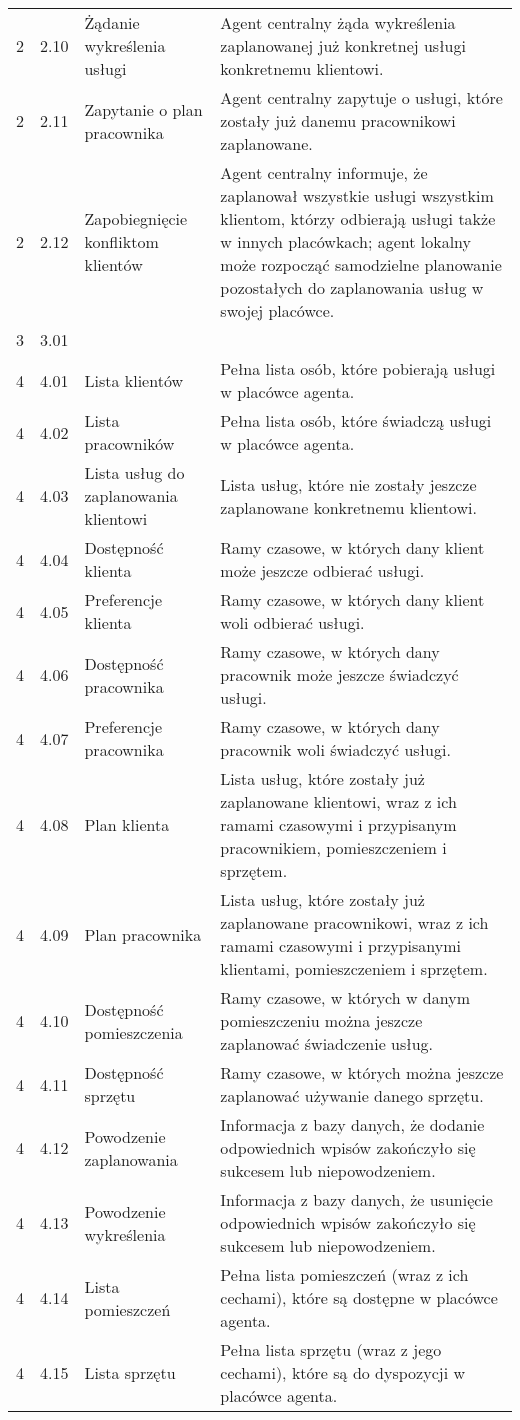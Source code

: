 \begin{tabular}{c|c|p{3cm}|p{5cm}}
2 & 2.10 & Żądanie wykreślenia usługi & Agent centralny żąda wykreślenia zaplanowanej już konkretnej usługi konkretnemu klientowi.\\
2 & 2.11 & Zapytanie o plan pracownika & Agent centralny zapytuje o usługi, które zostały już danemu pracownikowi zaplanowane.\\
2 & 2.12 & Zapobiegnięcie konfliktom klientów & Agent centralny informuje, że zaplanował wszystkie usługi wszystkim klientom, którzy odbierają usługi także w innych placówkach; agent lokalny może rozpocząć samodzielne planowanie pozostałych do zaplanowania usług w swojej placówce.\\
\hline
3 & 3.01 & 	 & \\
\hline
4 & 4.01 & Lista klientów & Pełna lista osób, które pobierają usługi w placówce agenta.\\
4 & 4.02 & Lista pracowników & Pełna lista osób, które świadczą usługi w placówce agenta.\\
4 & 4.03 & Lista usług do zaplanowania klientowi & Lista usług, które nie zostały jeszcze zaplanowane konkretnemu klientowi.\\
4 & 4.04 & Dostępność klienta & Ramy czasowe, w których dany klient może jeszcze odbierać usługi.\\
4 & 4.05 & Preferencje klienta & Ramy czasowe, w których dany klient woli odbierać usługi.\\
4 & 4.06 & Dostępność pracownika & Ramy czasowe, w których dany pracownik może jeszcze świadczyć usługi.\\
4 & 4.07 & Preferencje pracownika & Ramy czasowe, w których dany pracownik woli świadczyć usługi.\\
4 & 4.08 & Plan klienta & Lista usług, które zostały już zaplanowane klientowi, wraz z ich ramami czasowymi i przypisanym pracownikiem, pomieszczeniem i sprzętem.\\
4 & 4.09 & Plan pracownika & Lista usług, które zostały już zaplanowane pracownikowi, wraz z ich ramami czasowymi i przypisanymi klientami, pomieszczeniem i sprzętem.\\
4 & 4.10 & Dostępność pomieszczenia & Ramy czasowe, w których w danym pomieszczeniu można jeszcze zaplanować świadczenie usług.\\
4 & 4.11 & Dostępność sprzętu & Ramy czasowe, w których można jeszcze zaplanować używanie danego sprzętu.\\
4 & 4.12 & Powodzenie zaplanowania & Informacja z bazy danych, że dodanie odpowiednich wpisów zakończyło się sukcesem lub niepowodzeniem.\\
4 & 4.13 & Powodzenie wykreślenia & Informacja z bazy danych, że usunięcie odpowiednich wpisów zakończyło się sukcesem lub niepowodzeniem.\\
4 & 4.14 & Lista pomieszczeń & Pełna lista pomieszczeń (wraz z ich cechami), które są dostępne w placówce agenta.\\
4 & 4.15 & Lista sprzętu & Pełna lista sprzętu (wraz z jego cechami), które są do dyspozycji w placówce agenta.\\
\end{tabular}

